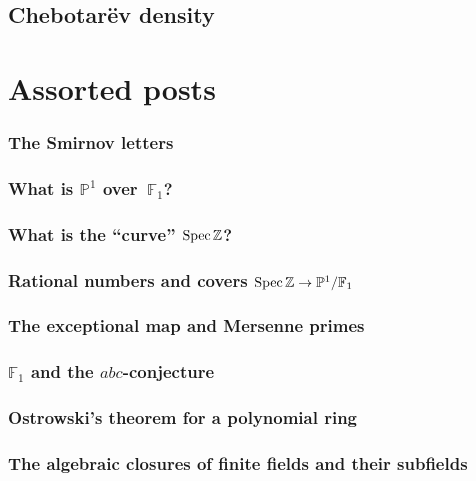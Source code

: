 \documentclass[a4paper]{memoir}
\begin{document}
\chapter{Chebotar\"ev density}




\part{Assorted posts}

\setcounter{section}{0}

\section{The Smirnov letters}


\section{What is $\mathbb{P}^1$ over~$\mathbb{F}_1$?}

\section{What is the ``curve'' $\operatorname{Spec}\mathbb{Z}$?}

\section{Rational numbers and covers $\operatorname{Spec}\mathbb{Z}\to\mathbb{P}^1/\mathbb{F}_1$}

\section{The exceptional map and Mersenne primes}

\section{$\mathbb{F}_1$ and the $abc$-conjecture}

\section{Ostrowski's theorem for a polynomial ring}

\section{The algebraic closures of finite fields and their subfields}

\end{document}
